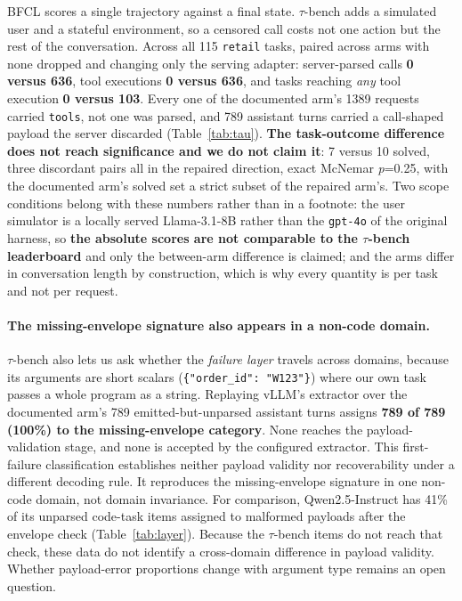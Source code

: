 BFCL scores a single trajectory against a final state. $\tau$-bench \citep{yao2025taubench} adds a
simulated user and a stateful environment, so a censored call costs not one action but the rest of
the conversation. Across all 115 \texttt{retail} tasks, paired across arms with none dropped and
changing only the serving adapter: server-parsed calls \textbf{0 versus 636}, tool executions
\textbf{0 versus 636}, and tasks reaching \emph{any} tool execution \textbf{0 versus 103}. Every
one of the documented arm's 1389 requests carried \texttt{tools}, not one was parsed, and 789
assistant turns carried a call-shaped payload the server discarded (Table~\ref{tab:tau}).
\textbf{The task-outcome difference does not reach significance and we do not claim it}: 7 versus
10 solved, three discordant pairs all in the repaired direction, exact McNemar \emph{p}=0.25, with
the documented arm's solved set a strict subset of the repaired arm's. Two scope conditions belong
with these numbers rather than in a footnote: the user simulator is a locally served
Llama-3.1-8B rather than the \texttt{gpt-4o} of the original harness, so \textbf{the absolute
scores are not comparable to the $\tau$-bench leaderboard} and only the between-arm difference is
claimed; and the arms differ in conversation length by construction, which is why every quantity
is per task and not per request.

\paragraph{The missing-envelope signature also appears in a non-code domain.}
$\tau$-bench also lets us ask whether the \emph{failure layer} travels across domains, because
its arguments are short scalars (\texttt{\{"order\_id": "W123"\}}) where our own task passes a
whole program as a string. Replaying vLLM's extractor over the documented arm's 789
emitted-but-unparsed assistant turns assigns \textbf{789 of 789 (100\%) to the missing-envelope
category}. None reaches the payload-validation stage, and none is accepted by the configured
extractor. This first-failure classification establishes neither payload validity nor
recoverability under a different decoding rule. It reproduces the missing-envelope signature
in one non-code domain, not domain invariance. For comparison, Qwen2.5-Instruct has 41\% of
its unparsed code-task items assigned to malformed payloads after the envelope check
(Table~\ref{tab:layer}). Because the $\tau$-bench items do not reach that check, these data
do not identify a cross-domain difference in payload validity. Whether payload-error
proportions change with argument type remains an open question.

